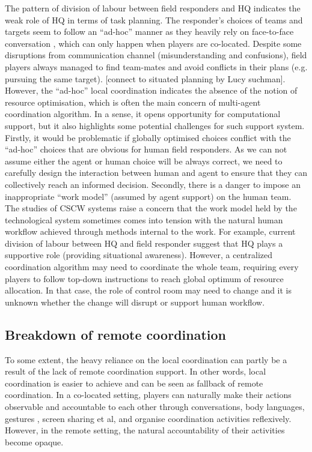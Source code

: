 The pattern of division of labour between field responders and HQ indicates the weak role of HQ in terms of task planning. The responder's choices of teams and targets seem to follow an ``ad-hoc'' manner as they heavily rely on face-to-face conversation , which can only happen when players are co-located. Despite some disruptions from communication channel (misunderstanding and confusions), field players always managed to find team-mates and avoid conflicts in their plans (e.g. pursuing the same target). [connect to situated planning by Lucy suchman]. However, the ``ad-hoc'' local coordination indicates the absence of the notion of resource optimisation, which is often the main concern of multi-agent coordination algorithm. In a sense, it opens opportunity for computational support, but it also highlights some potential challenges for such support system. \\

Firstly, it would be problematic if globally optimised choices conflict with the ``ad-hoc'' choices that are obvious for human field responders. As we can not assume either the agent or human choice will be always correct, we need to carefully design the interaction between human and agent to ensure that they can collectively reach an informed decision. Secondly, there is a danger to impose an inappropriate ``work model'' (assumed by agent support) on the human team. The studies of CSCW systems \cite{Bowers1994} raise a concern that the work model held by the technological system sometimes comes into tension with the natural human workflow achieved through methods internal to the work. For example, current division of labour between HQ and field responder suggest that HQ plays a supportive role (providing situational awareness). However, a centralized coordination algorithm may need to coordinate the whole team, requiring every players to follow top-down instructions to reach global optimum of resource allocation. In that case, the role of control room may need to change and it is unknown whether the change will disrupt or support human workflow.  \\

\subsection{Breakdown of remote coordination}\label{sec:study1breakdown}
To some extent, the heavy reliance on the local coordination can partly be a result of the lack of remote coordination support. In other words, local coordination is easier to achieve and can be seen as fallback of remote coordination. In a co-located setting, players can naturally make their actions observable and accountable to each other through conversations, body languages, gestures , screen sharing et al, and organise coordination activities reflexively. However, in the remote setting, the natural accountability of their activities become opaque.\\

